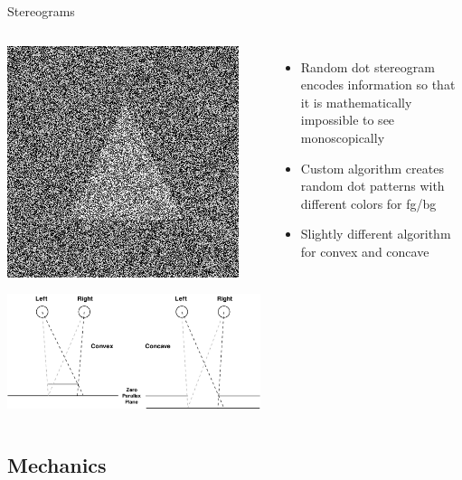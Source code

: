 \documentclass[12pt,ucs,hyperref={pdftext}]{beamer}
\newlength{\columnleft}
\newlength{\columnright}
\begin{document}
\begin{frame}{Stereograms}
\begin{columns}

\column{\columnleft}
\begin{center}
\includegraphics[scale=0.25]{screenshots/rds_example.png}

\bigskip

\includegraphics[scale=0.25]{media/rds.pdf}
\end{center}

\column{\columnright}
\begin{itemize}%
\item Random dot stereogram encodes information so that it is mathematically impossible to see monoscopically
\item Custom algorithm creates random dot patterns with different colors for fg/bg
\item Slightly different algorithm for convex and concave
\end{itemize}

\end{columns}
\end{frame}


\subsection{Mechanics}
\end{document}
